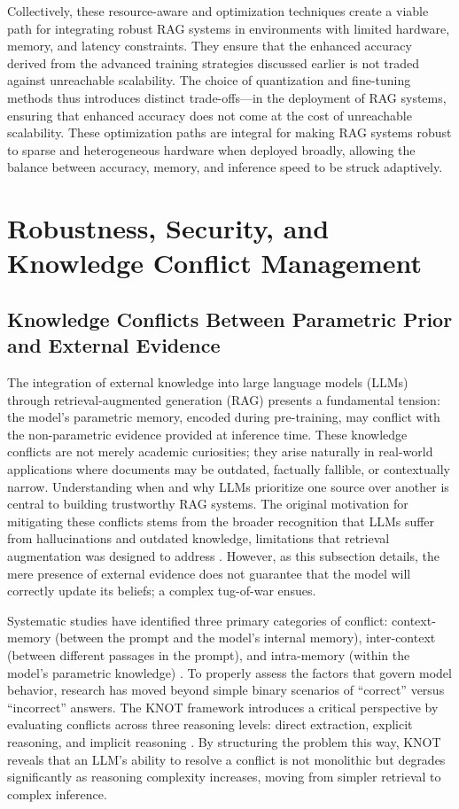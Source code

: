 \documentclass[11pt]{article}
\begin{document}
Collectively, these resource-aware and optimization techniques create a viable path for integrating robust RAG systems in environments with limited hardware, memory, and latency constraints. They ensure that the enhanced accuracy derived from the advanced training strategies discussed earlier is not traded against unreachable scalability. The choice of quantization and fine-tuning methods thus introduces distinct trade-offs---in the deployment of RAG systems, ensuring that enhanced accuracy does not come at the cost of unreachable scalability. These optimization paths are integral for making RAG systems robust to sparse and heterogeneous hardware when deployed broadly, allowing the balance between accuracy, memory, and inference speed to be struck adaptively.

\section{Robustness, Security, and Knowledge Conflict Management}

\subsection{Knowledge Conflicts Between Parametric Prior and External Evidence}

The integration of external knowledge into large language models (LLMs) through retrieval-augmented generation (RAG) presents a fundamental tension: the model's parametric memory, encoded during pre-training, may conflict with the non-parametric evidence provided at inference time. These knowledge conflicts are not merely academic curiosities; they arise naturally in real-world applications where documents may be outdated, factually fallible, or contextually narrow. Understanding when and why LLMs prioritize one source over another is central to building trustworthy RAG systems. The original motivation for mitigating these conflicts stems from the broader recognition that LLMs suffer from hallucinations and outdated knowledge, limitations that retrieval augmentation was designed to address \cite{ref24}. However, as this subsection details, the mere presence of external evidence does not guarantee that the model will correctly update its beliefs; a complex tug-of-war ensues.

Systematic studies have identified three primary categories of conflict: context-memory (between the prompt and the model's internal memory), inter-context (between different passages in the prompt), and intra-memory (within the model's parametric knowledge) \cite{ref250}. To properly assess the factors that govern model behavior, research has moved beyond simple binary scenarios of ``correct'' versus ``incorrect'' answers. The KNOT framework introduces a critical perspective by evaluating conflicts across three reasoning levels: direct extraction, explicit reasoning, and implicit reasoning \cite{ref251}. By structuring the problem this way, KNOT reveals that an LLM's ability to resolve a conflict is not monolithic but degrades significantly as reasoning complexity increases, moving from simpler retrieval to complex inference.
\end{document}
